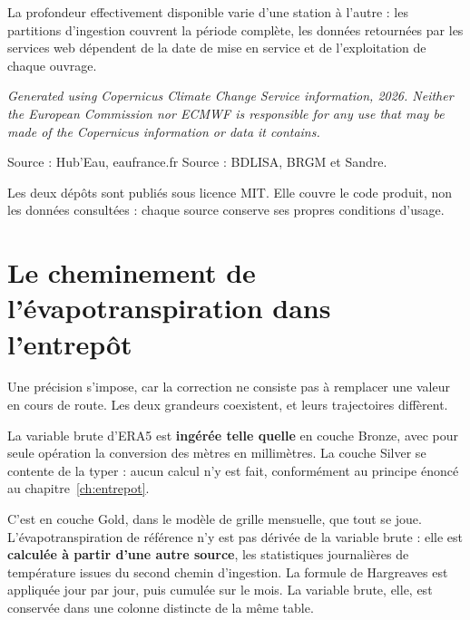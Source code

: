 \noindent
La profondeur effectivement disponible varie d'une station à l'autre : les partitions
d'ingestion couvrent la période complète, les données retournées par les services web dépendent
de la date de mise en service et de l'exploitation de chaque ouvrage.

\begin{encadre}[title={Mentions obligatoires}]
\emph{Generated using Copernicus Climate Change Service information, 2026. Neither the European
Commission nor ECMWF is responsible for any use that may be made of the Copernicus information
or data it contains.}

\vspace{0.4em}
Source : Hub'Eau, eaufrance.fr \quad\textbullet\quad Source : BDLISA, BRGM et Sandre.

\vspace{0.4em}
Les deux dépôts sont publiés sous licence MIT. Elle couvre le code produit, non les données
consultées : chaque source conserve ses propres conditions d'usage.
\end{encadre}

\section{Le cheminement de l'évapotranspiration dans l'entrepôt}
\label{ann:etp}

Une précision s'impose, car la correction ne consiste pas à remplacer une valeur en cours de
route. Les deux grandeurs coexistent, et leurs trajectoires diffèrent.

La variable brute d'ERA5 est \textbf{ingérée telle quelle} en couche Bronze, avec pour seule
opération la conversion des mètres en millimètres. La couche Silver se contente de la typer :
aucun calcul n'y est fait, conformément au principe énoncé au chapitre~\ref{ch:entrepot}.

C'est en couche Gold, dans le modèle de grille mensuelle, que tout se joue. L'évapotranspiration
de référence n'y est pas dérivée de la variable brute : elle est \textbf{calculée à partir d'une
autre source}, les statistiques journalières de température issues du second chemin d'ingestion.
La formule de Hargreaves est appliquée jour par jour, puis cumulée sur le mois. La variable
brute, elle, est conservée dans une colonne distincte de la même table.

